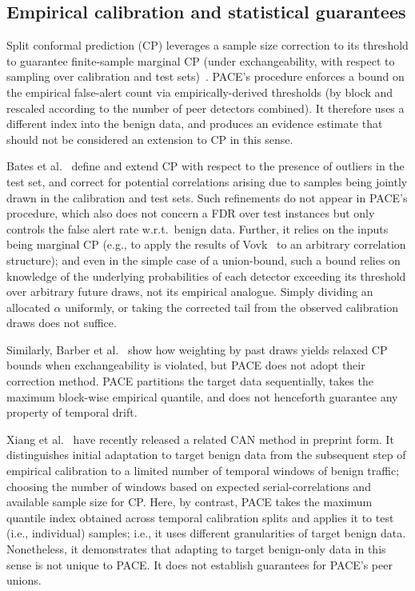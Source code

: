 \subsection{Empirical calibration and statistical guarantees} 
Split conformal prediction (CP) leverages a sample size correction to its threshold to guarantee finite-sample marginal CP (under exchangeability, with respect to sampling over calibration and test sets)~\cite{angelopoulos2023conformal}. PACE's procedure enforces a bound on the empirical false-alert count via empirically-derived thresholds (by block and rescaled according to the number of peer detectors combined). It therefore uses a different index into the benign data, and produces an evidence estimate that should not be considered an extension to CP in this sense.

Bates et al.~\cite{bates2023outliers} define and extend CP with respect to the presence of outliers in the test set, and correct for potential correlations arising due to samples being jointly drawn in the calibration and test sets. Such refinements do not appear in PACE's procedure, which also does not concern a FDR over test instances but only controls the false alert rate w.r.t.~benign data. Further, it relies on the inputs being marginal CP (e.g., to apply the results of Vovk~\cite{vovk2020averaging} to an arbitrary correlation structure); and even in the simple case of a union-bound, such a bound relies on knowledge of the underlying probabilities of each detector exceeding its threshold over arbitrary future draws, not its empirical analogue. Simply dividing an allocated $\alpha$ uniformly, or taking the corrected tail from the observed calibration draws does not suffice.

Similarly, Barber et al.~\cite{barber2023nonexchangeable} show how weighting by past draws yields relaxed CP bounds when exchangeability is violated, but PACE does not adopt their correction method. PACE partitions the target data sequentially, takes the maximum block-wise empirical quantile, and does not henceforth guarantee any property of temporal drift.

Xiang et al.~\cite{xiang2026can} have recently released a related CAN method in preprint form. It distinguishes initial adaptation to target benign data from the subsequent step of empirical calibration to a limited number of temporal windows of benign traffic; choosing the number of windows based on expected serial-correlations and available sample size for CP. Here, by contrast, PACE takes the maximum quantile index obtained across temporal calibration splits and applies it to test (i.e., individual) samples; i.e., it uses different granularities of target benign data. Nonetheless, it demonstrates that adapting to target benign-only data in this sense is not unique to PACE. It does not establish guarantees for PACE's peer unions.

